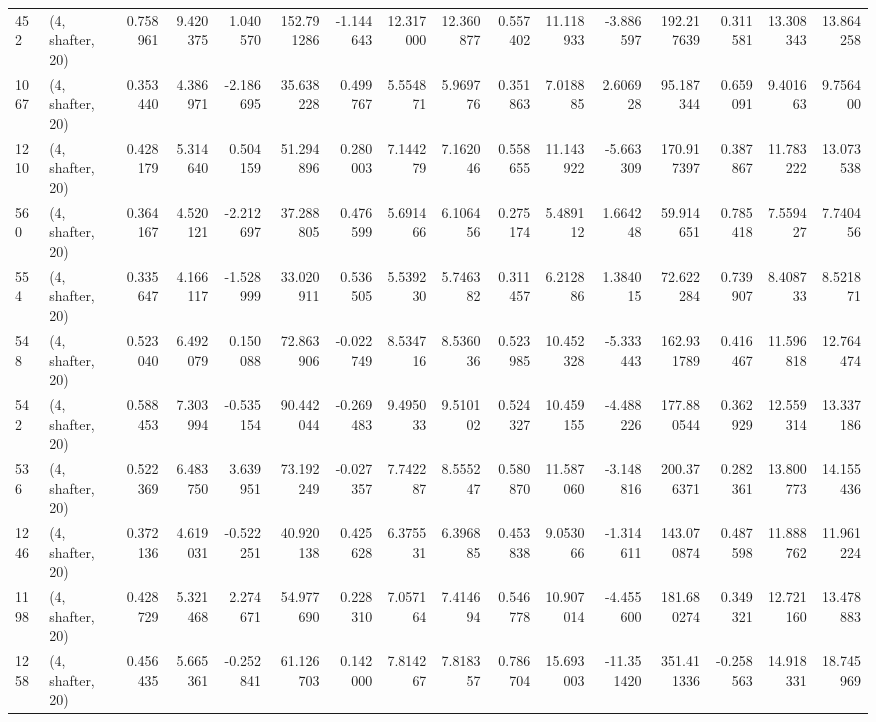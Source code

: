 \begin{tabular}{llrrrrrrrrrrrrrr}
452  &  (4, shafter, 20) &   0.758961 &   9.420375 &   1.040570 &    152.791286 &   -1.144643 &   12.317000 &   12.360877 &  0.557402 &  11.118933 &  -3.886597 &   192.217639 &   0.311581 &  13.308343 &  13.864258 \\
1067 &  (4, shafter, 20) &   0.353440 &   4.386971 &  -2.186695 &     35.638228 &    0.499767 &    5.554871 &    5.969776 &  0.351863 &   7.018885 &   2.606928 &    95.187344 &   0.659091 &   9.401663 &   9.756400 \\
1210 &  (4, shafter, 20) &   0.428179 &   5.314640 &   0.504159 &     51.294896 &    0.280003 &    7.144279 &    7.162046 &  0.558655 &  11.143922 &  -5.663309 &   170.917397 &   0.387867 &  11.783222 &  13.073538 \\
560  &  (4, shafter, 20) &   0.364167 &   4.520121 &  -2.212697 &     37.288805 &    0.476599 &    5.691466 &    6.106456 &  0.275174 &   5.489112 &   1.664248 &    59.914651 &   0.785418 &   7.559427 &   7.740456 \\
554  &  (4, shafter, 20) &   0.335647 &   4.166117 &  -1.528999 &     33.020911 &    0.536505 &    5.539230 &    5.746382 &  0.311457 &   6.212886 &   1.384015 &    72.622284 &   0.739907 &   8.408733 &   8.521871 \\
548  &  (4, shafter, 20) &   0.523040 &   6.492079 &   0.150088 &     72.863906 &   -0.022749 &    8.534716 &    8.536036 &  0.523985 &  10.452328 &  -5.333443 &   162.931789 &   0.416467 &  11.596818 &  12.764474 \\
542  &  (4, shafter, 20) &   0.588453 &   7.303994 &  -0.535154 &     90.442044 &   -0.269483 &    9.495033 &    9.510102 &  0.524327 &  10.459155 &  -4.488226 &   177.880544 &   0.362929 &  12.559314 &  13.337186 \\
536  &  (4, shafter, 20) &   0.522369 &   6.483750 &   3.639951 &     73.192249 &   -0.027357 &    7.742287 &    8.555247 &  0.580870 &  11.587060 &  -3.148816 &   200.376371 &   0.282361 &  13.800773 &  14.155436 \\
1246 &  (4, shafter, 20) &   0.372136 &   4.619031 &  -0.522251 &     40.920138 &    0.425628 &    6.375531 &    6.396885 &  0.453838 &   9.053066 &  -1.314611 &   143.070874 &   0.487598 &  11.888762 &  11.961224 \\
1198 &  (4, shafter, 20) &   0.428729 &   5.321468 &   2.274671 &     54.977690 &    0.228310 &    7.057164 &    7.414694 &  0.546778 &  10.907014 &  -4.455600 &   181.680274 &   0.349321 &  12.721160 &  13.478883 \\
1258 &  (4, shafter, 20) &   0.456435 &   5.665361 &  -0.252841 &     61.126703 &    0.142000 &    7.814267 &    7.818357 &  0.786704 &  15.693003 & -11.351420 &   351.411336 &  -0.258563 &  14.918331 &  18.745969 \\

\end{tabular}
